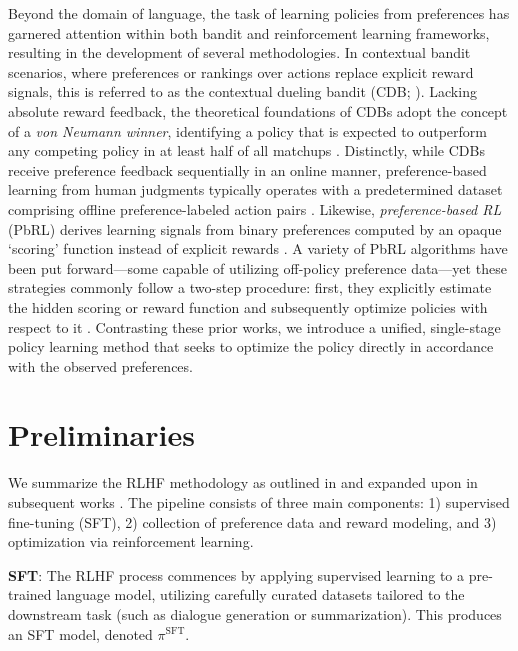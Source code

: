Beyond the domain of language, the task of learning policies from preferences has garnered attention within both bandit and reinforcement learning frameworks, resulting in the development of several methodologies. In contextual bandit scenarios, where preferences or rankings over actions replace explicit reward signals, this is referred to as the contextual dueling bandit (CDB; \cite{yue2012karmed,dudik2015contextual}). Lacking absolute reward feedback, the theoretical foundations of CDBs adopt the concept of a \textit{von Neumann winner}, identifying a policy that is expected to outperform any competing policy in at least half of all matchups \citep{dudik2015contextual}. Distinctly, while CDBs receive preference feedback sequentially in an online manner, preference-based learning from human judgments typically operates with a predetermined dataset comprising offline preference-labeled action pairs \citep{yan2022human}. Likewise, \textit{preference-based RL} (PbRL) derives learning signals from binary preferences computed by an opaque `scoring' function instead of explicit rewards \citep{BusaFekete2014,ruiz2023dueling}. A variety of PbRL algorithms have been put forward—some capable of utilizing off-policy preference data—yet these strategies commonly follow a two-step procedure: first, they explicitly estimate the hidden scoring or reward function and subsequently optimize policies with respect to it \citep{jain2013learning,BusaFekete2014,christiano2017deep,sadigh2017active,kupcsik2018learning}. Contrasting these prior works, we introduce a unified, single-stage policy learning method that seeks to optimize the policy directly in accordance with the observed preferences.

\section{Preliminaries}\label{section:prelims}

We summarize the RLHF methodology as outlined in \citeauthor{ziegler2020finetuning} and expanded upon in subsequent works \citep{stiennon2022learning, bai2022training, ouyang2022training}. The pipeline consists of three main components: 1) supervised fine-tuning (SFT), 2) collection of preference data and reward modeling, and 3) optimization via reinforcement learning.

\textbf{SFT}: The RLHF process commences by applying supervised learning to a pre-trained language model, utilizing carefully curated datasets tailored to the downstream task (such as dialogue generation or summarization). This produces an SFT model, denoted $\pi^\text{SFT}$.

